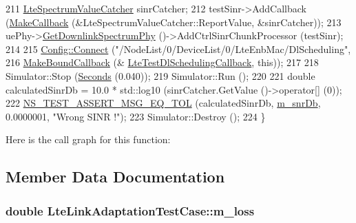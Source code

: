 \begin{DoxyCode}
211   \hyperlink{classns3_1_1LteSpectrumValueCatcher}{LteSpectrumValueCatcher} sinrCatcher;
212   testSinr->AddCallback (\hyperlink{group__makecallbackmemptr_ga9376283685aa99d204048d6a4b7610a4}{MakeCallback} (&LteSpectrumValueCatcher::ReportValue, &sinrCatcher));
213   uePhy->\hyperlink{classns3_1_1LtePhy_a9560f8862545c7c5760e7f6737c5b938}{GetDownlinkSpectrumPhy} ()->AddCtrlSinrChunkProcessor (testSinr);
214 
215   \hyperlink{group__config_ga4014f151241cd0939b6cb64409605736}{Config::Connect} (\textcolor{stringliteral}{"/NodeList/0/DeviceList/0/LteEnbMac/DlScheduling"},
216                    \hyperlink{group__makeboundcallback_ga1725d6362e6065faa0709f7c93f8d770}{MakeBoundCallback} (&
      \hyperlink{lte-test-link-adaptation_8cc_ab208a94bcab8811af6875fa7750b8991}{LteTestDlSchedulingCallback}, \textcolor{keyword}{this}));
217 
218   Simulator::Stop (\hyperlink{group__timecivil_ga33c34b816f8ff6628e33d5c8e9713b9e}{Seconds} (0.040));
219   Simulator::Run ();
220 
221   \textcolor{keywordtype}{double} calculatedSinrDb = 10.0 * std::log10 (sinrCatcher.GetValue ()->operator[] (0));
222   \hyperlink{group__testing_ga9e7861b56b4e70db3b56044cb7a28e41}{NS\_TEST\_ASSERT\_MSG\_EQ\_TOL} (calculatedSinrDb, \hyperlink{classLteLinkAdaptationTestCase_ae48411edbef532314f5031f8a5371cca}{m\_snrDb}, 0.0000001, \textcolor{stringliteral}{"Wrong
       SINR !"});
223   Simulator::Destroy ();
224 \}
\end{DoxyCode}


Here is the call graph for this function\+:




\subsection{Member Data Documentation}
\subsubsection[{\texorpdfstring{m\+\_\+loss}{m_loss}}]{\setlength{\rightskip}{0pt plus 5cm}double Lte\+Link\+Adaptation\+Test\+Case\+::m\+\_\+loss\hspace{0.3cm}{\ttfamily [private]}}\hypertarget{classLteLinkAdaptationTestCase_a6506f5bd0db4467756819735634a3237}{}\label{classLteLinkAdaptationTestCase_a6506f5bd0db4467756819735634a3237}
